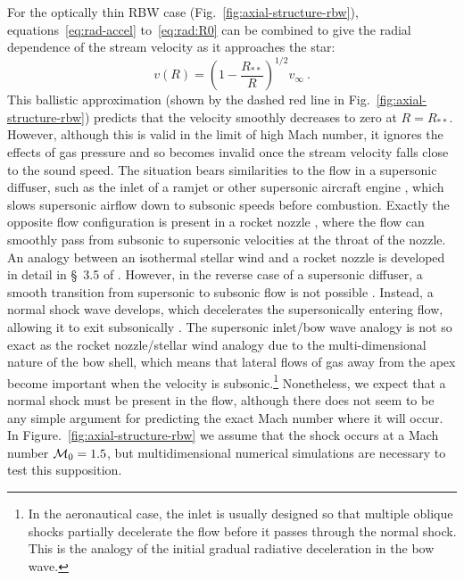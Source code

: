 For the optically thin RBW case (Fig.~\ref{fig:axial-structure-rbw}),
equations~\eqref{eq:rad-accel} to~\eqref{eq:rad:R0} can be combined to
give the radial dependence of the stream velocity as it approaches the
star:
\begin{equation}
  \label{eq:v-RBW-ballistic}
  v(R) = \left( 1 - \frac{R_{**}}{R} \right)^{1/2} v_\infty \ .
\end{equation}
This ballistic approximation (shown by the dashed red line in
Fig.~\ref{fig:axial-structure-rbw}) predicts that the velocity smoothly
decreases to zero at \(R = R_{**}\).  However, although this is valid
in the limit of high Mach number, it ignores the effects of gas
pressure and so becomes invalid once the stream velocity falls close
to the sound speed.  The situation bears similarities to the flow in a
supersonic diffuser, such as the inlet of a ramjet or other supersonic
aircraft engine \citep{Seddon:1999a}, which slows supersonic airflow
down to subsonic speeds before combustion.  Exactly the opposite flow
configuration is present in a rocket nozzle \citep{Courant:1948a},
where the flow can smoothly pass from subsonic to supersonic
velocities at the throat of the nozzle.  An analogy between an
isothermal stellar wind and a rocket nozzle is developed in detail in
\S~3.5 of \citet{Lamers:1999b}.  However, in the reverse case of a
supersonic diffuser, a smooth transition from supersonic to subsonic
flow is not possible \citep{Morawetz:1956a}.  Instead, a normal shock
wave develops, which decelerates the supersonically entering flow,
allowing it to exit subsonically \citep{Embid:1984a, Hafez:1999a}.
The supersonic inlet/bow wave analogy is not so exact as the rocket
nozzle/stellar wind analogy due to the multi-dimensional nature of the
bow shell, which means that lateral flows of gas away from the apex
become important when the velocity is subsonic.\footnote{%
  In the aeronautical case, the inlet is usually designed so that
  multiple oblique shocks partially decelerate the flow before it
  passes through the normal shock.  This is the analogy of the initial
  gradual radiative deceleration in the bow wave.  } %
Nonetheless, we expect that a normal shock must be present in the
flow, although there does not seem to be any simple argument for
predicting the exact Mach number where it will occur.  In
Figure.~\ref{fig:axial-structure-rbw} we assume that the shock occurs at
a Mach number \(\mathcal{M}_0 = 1.5\), but multidimensional numerical
simulations are necessary to test this supposition.

